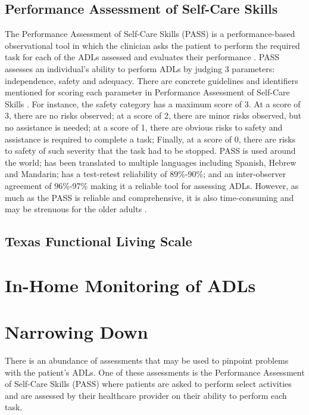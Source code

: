 \subsection{Performance Assessment of Self-Care Skills}
The Performance Assessment of Self-Care Skills (PASS) is a performance-based observational tool in which the clinician asks the patient to perform the required task for each of the ADLs assessed and evaluates their performance \cite{pashmdarfard_assessment_2020}. PASS assesses an individual’s ability to perform ADLs by judging 3 parameters: independence, safety and adequacy. There are concrete guidelines and identifiers mentioned for scoring each parameter in Performance Assessment of Self-Care Skills \cite{rogers_performance_2014}. For instance, the safety category has a maximum score of 3. At a score of 3, there are no risks observed; at a score of 2, there are minor risks observed, but no assistance is needed; at a score of 1, there are obvious risks to safety and assistance is required to complete a task; Finally, at a score of 0, there are risks to safety of such severity that the task had to be stopped. PASS is used around the world; has been translated to multiple languages including Spanish, Hebrew and Mandarin; has a test-retest reliability of 89\%-90\%; and an inter-observer agreement of 96\%-97\% \cite{chisholm_evaluating_2014} making it a reliable tool for assessing ADLs. However, as much as the PASS is reliable and comprehensive, it is also time-consuming and may be strenuous for the older adults \cite{pashmdarfard_assessment_2020}. 


\subsection{Texas Functional Living Scale}


\section{In-Home Monitoring of ADLs}


\section{Narrowing Down}

There is an abundance of assessments that may be used to pinpoint problems with the patient’s ADLs. One of these assessments is the Performance Assessment of Self-Care Skills (PASS) where patients are asked to perform select activities and are assessed by their healthcare provider on their ability to perform each task. 


